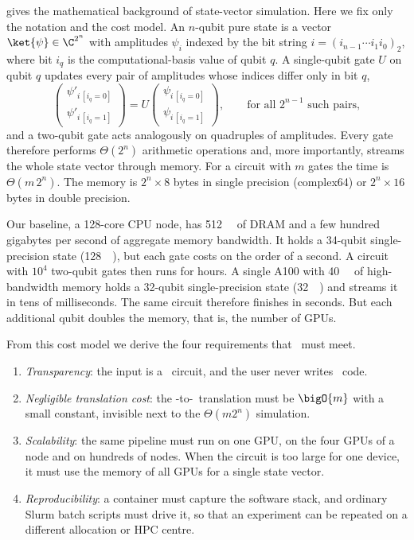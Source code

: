  gives the mathematical background of state-vector simulation. Here we fix only the notation and the cost model. An $n$-qubit pure state is a vector $\ket{\psi}\in\C^{2^{n}}$ with amplitudes $\psi_{i}$ indexed by the bit string $i=(i_{n-1}\cdots i_{1}i_{0})_{2}$, where bit $i_{q}$ is the computational-basis value of qubit $q$. A single-qubit gate $U$ on qubit $q$ updates every pair of amplitudes whose indices differ only in bit $q$,
\begin{equation}\label{eq:qgear:sqgate}
  \begin{pmatrix}\psi'_{i\,[i_{q}=0]}\\ \psi'_{i\,[i_{q}=1]}\end{pmatrix}
  = U \begin{pmatrix}\psi_{i\,[i_{q}=0]}\\ \psi_{i\,[i_{q}=1]}\end{pmatrix},
  \qquad \text{for all } 2^{n-1} \text{ such pairs},
\end{equation}
and a two-qubit gate acts analogously on quadruples of amplitudes. Every gate therefore performs $\Theta(2^{n})$ arithmetic operations and, more importantly, streams the whole state vector through memory. For a circuit with $m$ gates the time is $\Theta(m\,2^{n})$. The memory is $2^{n}\times 8$ bytes in single precision (complex64) or $2^{n}\times 16$ bytes in double precision.

Our baseline, a 128-core CPU node, has \SI{512}{\giga\byte} of DRAM and a few hundred gigabytes per second of aggregate memory bandwidth. It holds a 34-qubit single-precision state (\SI{128}{\giga\byte}), but each gate costs on the order of a second. A circuit with $10^{4}$ two-qubit gates then runs for hours. A single A100 with \SI{40}{\giga\byte} of high-bandwidth memory holds a 32-qubit single-precision state (\SI{32}{\giga\byte}) and streams it in tens of milliseconds. The same circuit therefore finishes in seconds. But each additional qubit doubles the memory, that is, the number of GPUs.

From this cost model we derive the four requirements that \qgear\ must meet.
\begin{enumerate}
  \item \emph{Transparency}: the input is a \qiskit\ circuit, and the user never writes \cudaq\ code.
  \item \emph{Negligible translation cost}: the \qiskit-to-\cudaq\ translation must be $\bigO{m}$ with a small constant, invisible next to the $\Theta(m 2^{n})$ simulation.
  \item \emph{Scalability}: the same pipeline must run on one GPU, on the four GPUs of a node and on hundreds of nodes. When the circuit is too large for one device, it must use the memory of all GPUs for a single state vector.
  \item \emph{Reproducibility}: a container must capture the software stack, and ordinary Slurm batch scripts must drive it, so that an experiment can be repeated on a different allocation or HPC centre.
\end{enumerate}

